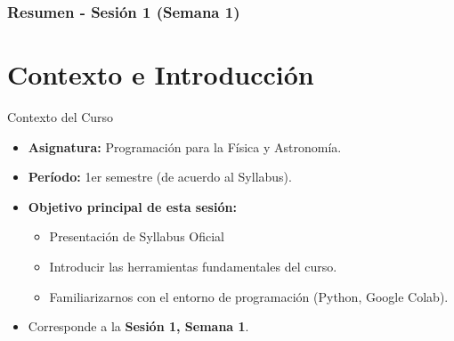 \documentclass[10pt]{beamer}
\begin{document}
\myfront{}

\begin{frame}
  \titlepage
\end{frame}

\begin{frame}
  \frametitle{Resumen - Sesión 1 (Semana 1)}
  \tableofcontents
\end{frame}


\section{Contexto e Introducción}

\begin{frame}{Contexto del Curso}
  \begin{itemize}
    \item \textbf{Asignatura:} Programación para la Física y Astronomía.
    \item \textbf{Período:} 1er semestre (de acuerdo al Syllabus).
    \item \textbf{Objetivo principal de esta sesión:}
      \begin{itemize}
        \item Presentación de Syllabus Oficial
        \item Introducir las herramientas fundamentales del curso.
        \item Familiarizarnos con el entorno de programación (Python, Google Colab).
      \end{itemize}
    \item Corresponde a la \textbf{Sesión 1, Semana 1}.
  \end{itemize}
\end{frame}
\end{document}
